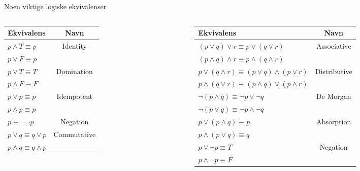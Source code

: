 \begin{frame}{Noen viktige logiske ekvivalenser}
    \begin{columns}
    \begin{column}{0.32\textwidth}
        \begin{tabular}{l|c}
        Ekvivalens & Navn \\ \hline
        $p \land T \equiv p$ & Identity\\
        $p \lor F \equiv p$ \\ \hline
        
        $p \lor T \equiv T$ & Domination\\
        $p \land F \equiv F$\\ \hline
        
        $p \lor p \equiv p$ & Idempotent\\
        $p \land p \equiv p$ \\ \hline
        
        $p \equiv \lnot \lnot p$ & Negation\\ \hline
        
        $p \lor q \equiv q \lor p$ & Commutative\\
        $p \land q \equiv q \land p$ \\
        

    \end{tabular}
    \end{column}
    \begin{column}{0.52\textwidth}
        \begin{tabular}{l|c}
        Ekvivalens & Navn \\ \hline
        
        $(p \lor q) \lor r \equiv p \lor (q \lor r)$ & Associative\\
        $(p \land q) \land r \equiv p \land (q \land r)$ \\ \hline
        
        $p \lor (q \land r) \equiv (p \lor q) \land (p \lor r)$ & Distributive\\
        $p \land (q \lor r) \equiv (p \land q) \lor (p \land r)$ \\ \hline
        
        $\lnot (p \land q) \equiv \lnot p \lor \lnot q$ & De Morgan \\
        $\lnot (p \lor q) \equiv \lnot p \land \lnot q$ \\ \hline
        
        $p \lor (p \land q) \equiv p$ & Absorption \\
        $p \land (p \lor q) \equiv q$ \\ \hline
        
        $p \lor \lnot p \equiv T$ & Negation \\
        $p \land \lnot p \equiv F$ \\
        \end{tabular}
    \end{column}
\end{columns}
\end{frame}

